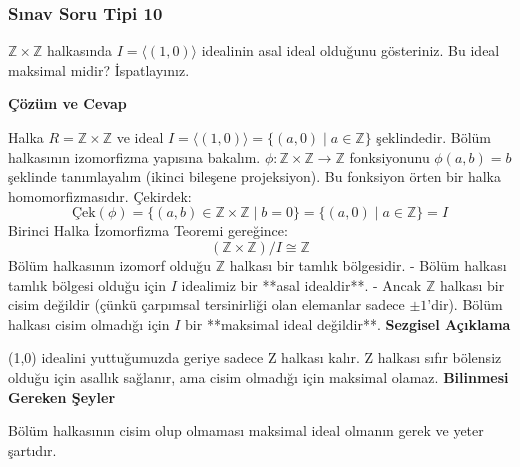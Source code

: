 \documentclass[11pt, a4paper]{article}
\newenvironment{cozum}{
    \vspace{0.5cm}
    \noindent\textcolor{green!60!black}{\faCheckCircle\enspace \textbf{\Large Çözüm ve Cevap}}\par\vspace{0.2cm}
}{}
\newenvironment{sezgisel}{
    \vspace{0.5cm}
    \noindent\textcolor{orange!80!black}{\faLightbulb\enspace \textbf{\Large Sezgisel Açıklama}}\par\vspace{0.2cm}
    \itshape
}{}
\newenvironment{bilgi}{
    \vspace{0.5cm}
    \noindent\textcolor{red!70!black}{\faExclamationTriangle\enspace \textbf{\Large Bilinmesi Gereken Şeyler}}\par\vspace{0.2cm}
}{}
\begin{document}
\subsubsection{Sınav Soru Tipi 10}
\begin{sinavbox}
$\mathbb{Z} \times \mathbb{Z}$ halkasında $I = \langle (1, 0) \rangle$ idealinin asal ideal olduğunu gösteriniz. Bu ideal maksimal midir? İspatlayınız.
\end{sinavbox}
\begin{cozum}
Halka $R = \mathbb{Z} \times \mathbb{Z}$ ve ideal $I = \langle (1, 0) \rangle = \{ (a, 0) \mid a \in \mathbb{Z} \}$ şeklindedir.
Bölüm halkasının izomorfizma yapısına bakalım. $\phi: \mathbb{Z} \times \mathbb{Z} \to \mathbb{Z}$ fonksiyonunu $\phi(a, b) = b$ şeklinde tanımlayalım (ikinci bileşene projeksiyon).
Bu fonksiyon örten bir halka homomorfizmasıdır.
Çekirdek:
\[ \text{Çek}(\phi) = \{ (a, b) \in \mathbb{Z} \times \mathbb{Z} \mid b = 0 \} = \{ (a, 0) \mid a \in \mathbb{Z} \} = I \]
Birinci Halka İzomorfizma Teoremi gereğince:
\[ (\mathbb{Z} \times \mathbb{Z}) / I \cong \mathbb{Z} \]
Bölüm halkasının izomorf olduğu $\mathbb{Z}$ halkası bir tamlık bölgesidir.
- Bölüm halkası tamlık bölgesi olduğu için $I$ idealimiz bir **asal idealdir**.
- Ancak $\mathbb{Z}$ halkası bir cisim değildir (çünkü çarpımsal tersinirliği olan elemanlar sadece $\pm 1$'dir). Bölüm halkası cisim olmadığı için $I$ bir **maksimal ideal değildir**.
\end{cozum}
\begin{sezgisel}
(1,0) idealini yuttuğumuzda geriye sadece Z halkası kalır. Z halkası sıfır bölensiz olduğu için asallık sağlanır, ama cisim olmadığı için maksimal olamaz.
\end{sezgisel}
\begin{bilgi}
Bölüm halkasının cisim olup olmaması maksimal ideal olmanın gerek ve yeter şartıdır.
\end{bilgi}

\newpage
\end{document}
